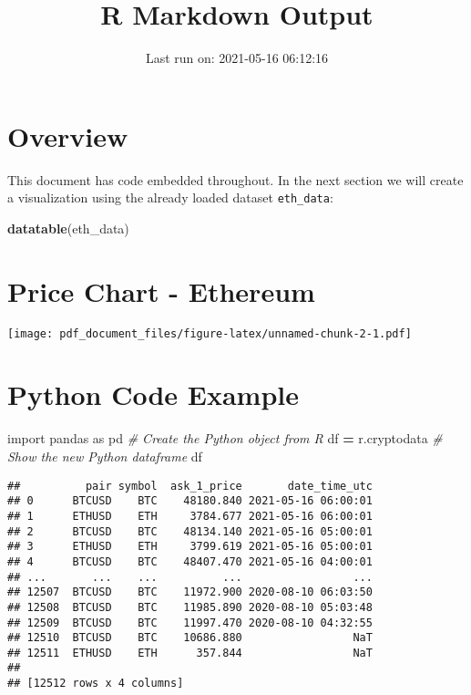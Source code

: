 \documentclass[
]{article}
\title{R Markdown Output}
\subtitle{Last run on: 2021-05-16 06:12:16}
\author{}
\date{\vspace{-2.5em}}
\newenvironment{Shaded}{\begin{snugshade}}{\end{snugshade}}
\newcommand{\CommentTok}[1]{\textcolor[rgb]{0.56,0.35,0.01}{\textit{#1}}}
\newcommand{\ImportTok}[1]{#1}
\newcommand{\KeywordTok}[1]{\textcolor[rgb]{0.13,0.29,0.53}{\textbf{#1}}}
\newcommand{\NormalTok}[1]{#1}
\newcommand{\OperatorTok}[1]{\textcolor[rgb]{0.81,0.36,0.00}{\textbf{#1}}}
\begin{document}
\maketitle

\hypertarget{overview}{%
\section{Overview}\label{overview}}

This document has code embedded throughout. In the next section we will
create a visualization using the already loaded dataset
\texttt{eth\_data}:

\begin{Shaded}
\begin{Highlighting}[]
\KeywordTok{datatable}\NormalTok{(eth_data)}
\end{Highlighting}
\end{Shaded}

\hypertarget{htmlwidget-b13d53e537693bbcbd53}{}

\hypertarget{price-chart---ethereum}{%
\section{Price Chart - Ethereum}\label{price-chart---ethereum}}

\texttt{[image: pdf\_document\_files/figure-latex/unnamed-chunk-2-1.pdf]}

\hypertarget{python-code-example}{%
\section{Python Code Example}\label{python-code-example}}

\begin{Shaded}
\begin{Highlighting}[]
\ImportTok{import}\NormalTok{ pandas }\ImportTok{as}\NormalTok{ pd}
\CommentTok{# Create the Python object from R}
\NormalTok{df }\OperatorTok{=}\NormalTok{ r.cryptodata}
\CommentTok{# Show the new Python dataframe}
\NormalTok{df}
\end{Highlighting}
\end{Shaded}

\begin{verbatim}
##          pair symbol  ask_1_price       date_time_utc
## 0      BTCUSD    BTC    48180.840 2021-05-16 06:00:01
## 1      ETHUSD    ETH     3784.677 2021-05-16 06:00:01
## 2      BTCUSD    BTC    48134.140 2021-05-16 05:00:01
## 3      ETHUSD    ETH     3799.619 2021-05-16 05:00:01
## 4      BTCUSD    BTC    48407.470 2021-05-16 04:00:01
## ...       ...    ...          ...                 ...
## 12507  BTCUSD    BTC    11972.900 2020-08-10 06:03:50
## 12508  BTCUSD    BTC    11985.890 2020-08-10 05:03:48
## 12509  BTCUSD    BTC    11997.470 2020-08-10 04:32:55
## 12510  BTCUSD    BTC    10686.880                 NaT
## 12511  ETHUSD    ETH      357.844                 NaT
## 
## [12512 rows x 4 columns]
\end{verbatim}
\end{document}
